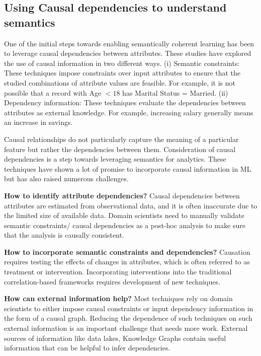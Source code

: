 \documentclass[sigconf]{acmart}
\begin{document}
\subsection{Using Causal dependencies to understand semantics}
One of the initial steps towards enabling semantically coherent learning has been to leverage  causal dependencies between attributes. 
These studies have explored the use of causal information in two different ways. (i) Semantic constraints: These techniques impose constraints over input attributes to ensure that the studied combinations of attribute values are feasible. For example, it is not possible that a record with Age $<18$ has Marital Status = Married.
(ii) Dependency information: These techniques evaluate the dependencies between attributes as external knowledge. For example, increasing salary generally means an increase in savings. 


Causal relationships do not particularly capture the meaning of a particular feature but rather the dependencies between them. Consideration of causal dependencies is a step towards leveraging semantics for analytics. 
These techniques have shown a lot of promise to incorporate causal information in ML but has also raised numerous challenges. 

\noindent \textbf{How to identify attribute dependencies?} Causal dependencies between attributes are estimated from observational data, and it is often inaccurate due to the limited size of available data. Domain scientists need to manually validate semantic constraints/ causal dependencies as a post-hoc analysis to make sure that the analysis is causally consistent.

\noindent \textbf{How to incorporate semantic constraints and dependencies?}
Causation requires testing the effects of changes in attributes, which is often referred to as treatment or intervention. Incorporating interventions into the traditional correlation-based frameworks requires development of new techniques.

\noindent \textbf{How can external information help?}
Most techniques rely on domain scientists to either impose causal constraints or input dependency information in the form of a causal graph. Reducing the dependence of such techniques on such external information is an important challenge that needs more work. External sources of information like data lakes, Knowledge Graphs contain useful information that can be helpful to infer dependencies. 





\end{document}
